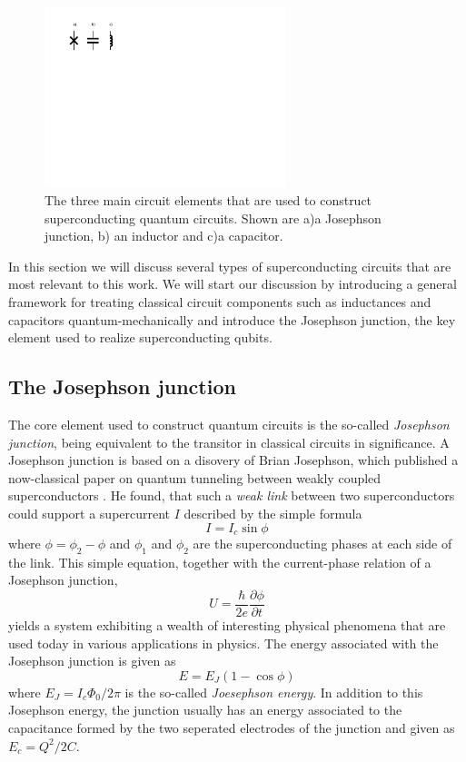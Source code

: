 \begin{figure}
	\includegraphics[width=7cm]{"./material/figures/introduction/circuit_elements"}
	\caption{The three main circuit elements that are used to construct superconducting quantum circuits. Shown are a)a Josephson junction, b) an inductor and c)a capacitor.}
	\label{fig:SuperconductingCircuitElements}
\end{figure}

In this section we will discuss several types of superconducting circuits that are most relevant to this work. We will start our discussion by introducing a general framework for treating classical circuit components such as inductances and capacitors quantum-mechanically and introduce the Josephson junction, the key element used to realize superconducting qubits.

\subsection{The Josephson junction}

The core element used to construct quantum circuits is the so-called {\it Josephson junction}, being equivalent to the transitor in classical circuits in significance. A Josephson junction is based on a disovery of Brian Josephson, which published a now-classical paper on quantum tunneling between weakly coupled superconductors \citep{josephson_possible_1962}. He found, that such a {\it weak link} between two superconductors could support a supercurrent $I$ described by the simple formula
%
\begin{equation}
I = I_c\sin{\phi}
\end{equation}
%
where $\phi = \phi_2-\phi$ and $\phi_1$ and $\phi_2$ are the superconducting phases at each side of the link. This simple equation, together with the current-phase relation of a Josephson junction,
%
\begin{equation}
U = \frac{\hbar}{2e}\frac{\partial \phi}{\partial t}
\end{equation}
%
yields a system exhibiting a  wealth of interesting physical phenomena that are used today in various applications in physics. The energy associated with the Josephson junction is given as
%
\begin{equation}
E = E_J(1-\cos{\phi})
\end{equation}
%
where $E_J = I_c \Phi_0/2\pi$ is the so-called {\it Joesephson energy}. In addition to this Josephson energy, the junction usually has an energy associated to the capacitance formed by the two seperated electrodes of the junction and given as $E_c = Q^2/2C$. 

